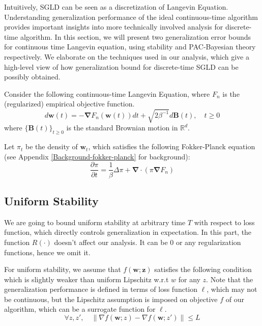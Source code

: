 \documentclass[final,12pt]{colt2018} %
\newcommand{\w}{\bm{w}}
\begin{document}
Intuitively, SGLD can be seen as a discretization of Langevin Equation. Understanding generalization performance of the ideal continuous-time algorithm provides important insights into more technically involved analysis for discrete-time algorithm. In this section, we will present two generalization error bounds for continuous time Langevin equation, using stability and PAC-Bayesian theory respectively. We elaborate on the techniques used in our analysis, which give a high-level view of how generalization bound for discrete-time SGLD can be possibly obtained.

Consider the following continuous-time Langevin Equation, where $F_n$ is the (regularized) empirical objective function.
\begin{equation}
  d\bm{w}(t)=-\bm{\nabla} F_n(\bm{w}(t))dt+\sqrt{2 \beta^{-1}}d\bm{B}(t),\quad t\ge 0
\end{equation}
where $\{\bm{B}(t)\}_{t\ge 0}$ is the standard Brownian motion in $\mathbb{R}^d$.

Let $\pi_t$ be the density of $\w_t$, which satisfies the following Fokker-Planck equation (see Appendix \ref{Background-fokker-planck} for background):
\begin{equation}
\label{F-P equation}
  \frac{\partial \pi}{\partial t}=\frac{1}{\beta}\Delta \pi+\bm{\nabla}\cdot(\pi\bm{\nabla} F_n)
\end{equation}


\subsection{Uniform Stability}

We are going to bound uniform stability at arbitrary time $T$ with respect to loss function, which directly controls generalization in expectation. In this part, the function $R(\cdot)$ doesn't affect our analysis. It can be 0 or any regularization functions, hence we omit it.

For uniform stability, we assume that $f(\bm{w};\bm{z})$ satisfies the following condition which is slightly weaker than uniform Lipschitz w.r.t $w$ for any $z$. Note that the generalization performance is defined in terms of loss function $\ell$, which may not be continuous, but the Lipschitz assumption is imposed on objective $f$ of our algorithm, which can be a surrogate function for $\ell$.
\begin{equation}
  \forall z,z',\quad\|\nabla f(\bm{w};z)-\nabla f(\bm{w};z')\|\le L
\end{equation}
\end{document}
